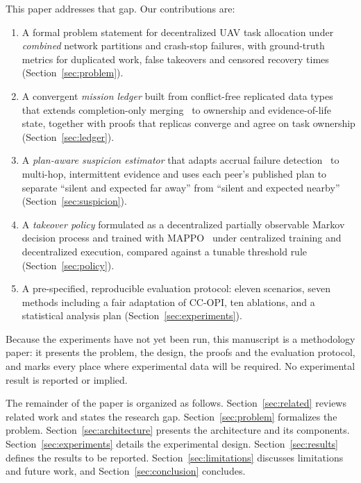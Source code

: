 \documentclass[journal]{IEEEtran}
\begin{document}
This paper addresses that gap. Our contributions are:
\begin{enumerate}
\item A formal problem statement for decentralized UAV task allocation under \emph{combined} network partitions and crash-stop failures, with ground-truth metrics for duplicated work, false takeovers and censored recovery times (Section~\ref{sec:problem}).
\item A convergent \emph{mission ledger} built from conflict-free replicated data types~\cite{R10_shapiro2011,R11_almeida2024} that extends completion-only merging~\cite{R66_liu2026} to ownership and evidence-of-life state, together with proofs that replicas converge and agree on task ownership (Section~\ref{sec:ledger}).
\item A \emph{plan-aware suspicion estimator} that adapts accrual failure detection~\cite{R07_hayashibara2004} to multi-hop, intermittent evidence and uses each peer's published plan to separate ``silent and expected far away'' from ``silent and expected nearby'' (Section~\ref{sec:suspicion}).
\item A \emph{takeover policy} formulated as a decentralized partially observable Markov decision process and trained with MAPPO~\cite{R62_yu2022} under centralized training and decentralized execution, compared against a tunable threshold rule (Section~\ref{sec:policy}).
\item A pre-specified, reproducible evaluation protocol: eleven scenarios, seven methods including a fair adaptation of CC-OPI, ten ablations, and a statistical analysis plan (Section~\ref{sec:experiments}).
\end{enumerate}

Because the experiments have not yet been run, this manuscript is a methodology paper: it presents the problem, the design, the proofs and the evaluation protocol, and marks every place where experimental data will be required. No experimental result is reported or implied.

The remainder of the paper is organized as follows. Section~\ref{sec:related} reviews related work and states the research gap. Section~\ref{sec:problem} formalizes the problem. Section~\ref{sec:architecture} presents the architecture and its components. Section~\ref{sec:experiments} details the experimental design. Section~\ref{sec:results} defines the results to be reported. Section~\ref{sec:limitations} discusses limitations and future work, and Section~\ref{sec:conclusion} concludes.
\end{document}
